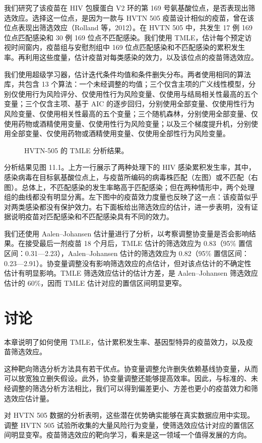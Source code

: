 我们研究了该疫苗在 HIV 包膜蛋白 V2 环的第 169 号氨基酸位点，是否表现出筛选效应。选择这一位点，是因为一款与 HVTN 505 疫苗设计相似的疫苗，曾在该位点表现出筛选效应（Rolland 等，2012）。在 HVTN 505 中，共发生 17 例 169 位点匹配感染和 30 例 169 位点不匹配感染。我们使用 TMLE，估计每个预定访视时间窗内，疫苗组与安慰剂组中 169 位点匹配感染和不匹配感染的累积发生率。再利用这些度量，估计疫苗对每类感染的效力，以及该位点的疫苗筛选效应。

我们使用超级学习器，估计迭代条件均值和条件删失分布。两者使用相同的算法库，共包含 13 个算法：一个未经调整的均值；三个仅含主项的广义线性模型，分别仅使用行为风险评分、仅使用性行为风险变量、仅使用与结局相关性最高的五个变量；三个仅含主项、基于 AIC 的逐步回归，分别使用全部变量、仅使用性行为风险变量、仅使用相关性最高的五个变量；三个随机森林，分别使用全部变量、仅使用药物或酒精使用变量、仅使用性行为风险变量；以及三个梯度提升机，分别使用全部变量、仅使用药物或酒精使用变量、仅使用全部性行为风险变量。

\begin{figure}[htbp]
 \centering
 
 \caption{HVTN-505 的 TMLE 分析结果。}
 \label{fig:ch11-sieve}
\end{figure}

分析结果见图 11.1。上方一行展示了两种处理下的 HIV 感染累积发生率，其中，感染病毒在目标氨基酸位点上，与疫苗所编码的病毒株匹配（左图）或不匹配（右图）。总体上，不匹配感染的发生率略高于匹配感染；但在两种情形中，两个处理组的曲线都没有明显分离。左下图中的疫苗效力度量也反映了这一点：该疫苗似乎对两类感染都没有保护效力。右下面板给出筛选效应的估计，进一步表明，没有证据说明疫苗对匹配感染和不匹配感染具有不同的效力。

我们还使用 Aalen--Johansen 估计量进行了分析，以考察调整协变量是否会影响结果。在接受最后一剂疫苗 18 个月后，TMLE 估计的筛选效应为 0.83（95\% 置信区间：0.31—2.23），Aalen--Johansen 估计的筛选效应为 0.82（95\% 置信区间：0.23—2.91）。协变量调整没有影响筛选效应的点估计，但对该点估计的不确定性估计有明显影响。TMLE 筛选效应估计的估计方差，是 Aalen--Johansen 筛选效应估计的 60\%，因而 TMLE 估计对应的置信区间明显更窄。

\section{讨论}

本章说明了如何使用 TMLE，估计累积发生率、基因型特异的疫苗效力，以及疫苗筛选效应。

\begin{sourcebox}
这种靶向筛选分析方法具有若干优点。协变量调整允许删失依赖基线协变量，从而可以放宽独立删失假设。此外，协变量调整还能够提高效率。因此，与标准的、未经调整的筛选分析方法相比，我们可以得到偏差更小、方差也更小的疫苗效力和筛选效应估计量。
\end{sourcebox}

对 HVTN 505 数据的分析表明，这些潜在优势确实能够在真实数据应用中实现。调整 HVTN 505 试验所收集的大量风险行为变量，使筛选效应估计对应的置信区间明显变窄。疫苗筛选效应的靶向学习，看来是这一领域一个值得发展的方向。
